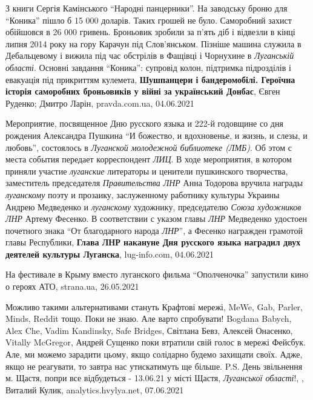 З книги Сергія Камінського \enquote{Народні панцерники}.  На заводську броню
для \enquote{Коника} пішло б 15 000 доларів. Таких грошей не було. Саморобний
захист обійшовся в 26 000 гривень. Броньовик зробили за п'ять діб і відвезли в
кінці липня 2014 року на гору Карачун під Слов'янськом.  Пізніше машина служила
в Дебальцевому і вижила під час обстрілів в Фащівці і Чорнухине в \emph{Луганській
області}. Основні завдання \enquote{Коника}: супровід колон, підтримка
підрозділів і евакуація під прикриттям кулемета,
\textbf{Шушпанцери і бандеромобілі. Героїчна історія саморобних броньовиків у війні за український Донбас},
Євген Руденко; Дмитро Ларін, pravda.com.ua, 04.06.2021

Мероприятие, посвященное Дню русского языка и 222-й годовщине со дня рождения
Александра Пушкина \enquote{И божество, и вдохновенье, и жизнь, и слезы, и
любовь}, состоялось в \emph{Луганской молодежной библиотеке (ЛМБ)}. Об этом с места
события передает корреспондент \emph{ЛИЦ}. В ходе мероприятия, в котором приняли
участие \emph{луганские} литераторы и ценители пушкинского творчества,
заместитель председателя \emph{Правительства ЛНР} Анна Тодорова вручила награды
\emph{луганскому} поэту и прозаику, заслуженному работнику культуры Украины
Андрею Медведенко и \emph{луганскому} художнику, председателю \emph{Союза художников
ЛНР} Артему Фесенко. В соответствии с указом главы \emph{ЛНР} Медведенко удостоен
почетного знака \enquote{От благодарного народа \emph{ЛНР}}, а Фесенко награжден
грамотой главы Республики,
\textbf{Глава ЛНР накануне Дня русского языка наградил двух деятелей культуры Луганска},
lug-info.com, 04.06.2021

На фестивале в Крыму вместо луганского фильма \enquote{Ополченочка} запустили кино о героях АТО,
strana.ua, 26.05.2021

Можливо такими альтернативами стануть Крафтові мережі, MeWe, Gab, Parler,
Minds, Reddit тощо. Поки не знаю. Але варто спробувати!  Bogdana Babych, Alex
Che, Vadim Kandinsky, Safe Bridges, Світлана Бевз, Алексей Онасенко, Vitally
McGregor, Андрей Сущенко поки втратили свій голос в мережі Фейсбук.  Але, ми
можемо зарадити цьому, якщо солідарно будемо захищати своїх. Адже, якщо не
реагувати, то завтра нас утискатимуть ще більше.  P.S. День звільнення м.
Щастя, попри все відбудеться - 13.06.21 у місті Щастя, \emph{Луганської
області}!,
, Виталий Кулик, analytics.hvylya.net, 07.06.2021

